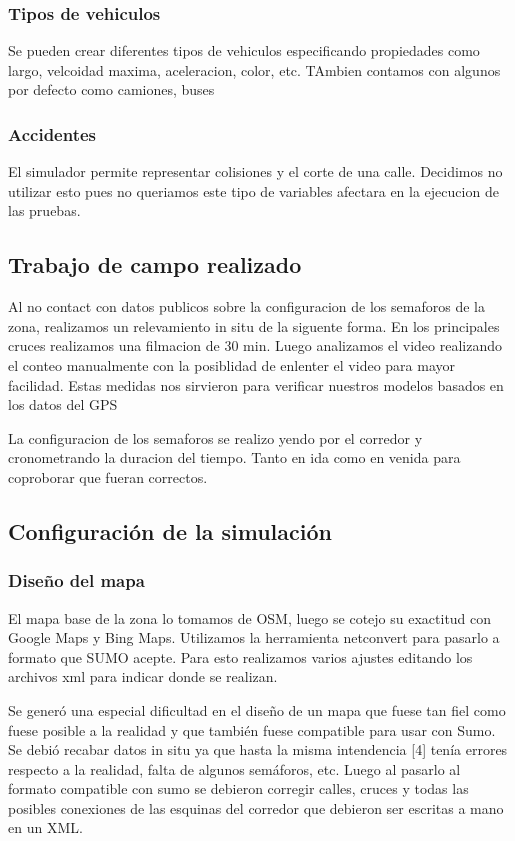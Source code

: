 \subsubsection{Tipos de vehiculos}
Se pueden crear diferentes tipos de vehiculos especificando propiedades como largo, velcoidad maxima,  aceleracion, color, etc. TAmbien contamos con algunos por defecto como camiones, buses

\subsubsection{Accidentes}
El simulador permite representar colisiones y el corte de una calle. Decidimos no utilizar esto pues no queriamos este tipo de variables afectara en la ejecucion de las pruebas.

\subsection{Trabajo de campo realizado}
Al no contact con datos publicos sobre la configuracion de los semaforos de la zona, realizamos un relevamiento in situ de la siguente forma.
En los principales cruces realizamos una filmacion de 30 min. Luego analizamos el video realizando el conteo manualmente con la posiblidad de enlenter el video para mayor facilidad.
Estas medidas nos sirvieron para verificar nuestros modelos basados en los datos del GPS 

La configuracion de los semaforos se realizo yendo por el corredor y cronometrando la duracion del tiempo. Tanto en ida como en venida para coproborar que fueran correctos.



\subsection{Configuración de la simulación}

\subsubsection{Diseño del mapa}
El mapa base de la zona lo tomamos de OSM, luego se cotejo su exactitud con Google Maps y Bing Maps.
Utilizamos la herramienta netconvert para pasarlo a formato que SUMO acepte. 
Para esto realizamos varios ajustes editando los archivos xml para indicar donde se realizan.

Se generó una especial dificultad en el diseño de un mapa que
fuese tan fiel como fuese posible a la realidad y que también
fuese compatible para usar con  Sumo. Se debió recabar datos
in  situ  ya  que  hasta  la  misma  intendencia  [4]  tenía  errores
respecto a la realidad, falta de algunos semáforos, etc. Luego al
pasarlo  al  formato  compatible  con  sumo  se  debieron  corregir
calles,  cruces  y  todas las  posibles  conexiones de  las  esquinas
del corredor que debieron ser escritas a mano en un XML.

